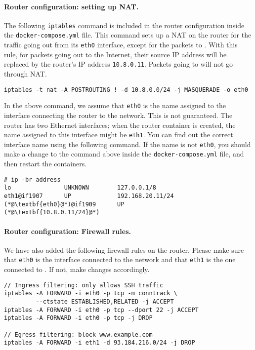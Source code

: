 \paragraph{Router configuration: setting up NAT.}
The following \texttt{iptables} command is included in
the router configuration inside the \texttt{docker-compose.yml} file.
This command sets up a NAT on the router for the traffic going out from its
\texttt{eth0} interface, except for the packets to \externalnet.
With this rule, for packets going out to the Internet, their
source IP address will be replaced by the router's IP address
\texttt{10.8.0.11}. Packets going to \externalnet will not
go through NAT.

\begin{lstlisting}
iptables -t nat -A POSTROUTING ! -d 10.8.0.0/24 -j MASQUERADE -o eth0
\end{lstlisting}

In the above command, we assume that \texttt{eth0} is the name
assigned to the interface connecting the router to the
\externalnet network. This is not guaranteed. The router
has two Ethernet interfaces; when the router container is created,
the name assigned to this interface might be \texttt{eth1}.
You can find out the correct interface name using the following command.
If the name is not \texttt{eth0}, you should make a
change to the command above inside the \texttt{docker-compose.yml} file,
and then restart the containers.

\begin{lstlisting}
# ip -br address
lo               UNKNOWN        127.0.0.1/8
eth1@if1907      UP             192.168.20.11/24
(*@\textbf{eth0}@*)@if1909      UP             (*@\textbf{10.8.0.11/24}@*)
\end{lstlisting}

\paragraph{Router configuration: Firewall rules.}
We have also added the following firewall rules on the router.
Please make sure that \texttt{eth0} is the interface connected
to the \externalnet network and that
\texttt{eth1} is the one connected to \internalnet.
If not, make changes accordingly.

\begin{lstlisting}
// Ingress filtering: only allows SSH traffic
iptables -A FORWARD -i eth0 -p tcp -m conntrack \
         --ctstate ESTABLISHED,RELATED -j ACCEPT
iptables -A FORWARD -i eth0 -p tcp --dport 22 -j ACCEPT
iptables -A FORWARD -i eth0 -p tcp -j DROP

// Egress filtering: block www.example.com
iptables -A FORWARD -i eth1 -d 93.184.216.0/24 -j DROP
\end{lstlisting}

